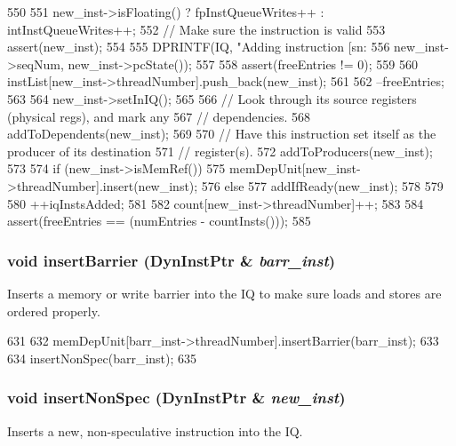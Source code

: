 \begin{DoxyCode}
550 {
551     new_inst->isFloating() ? fpInstQueueWrites++ : intInstQueueWrites++;
552     // Make sure the instruction is valid
553     assert(new_inst);
554 
555     DPRINTF(IQ, "Adding instruction [sn:%
556             new_inst->seqNum, new_inst->pcState());
557 
558     assert(freeEntries != 0);
559 
560     instList[new_inst->threadNumber].push_back(new_inst);
561 
562     --freeEntries;
563 
564     new_inst->setInIQ();
565 
566     // Look through its source registers (physical regs), and mark any
567     // dependencies.
568     addToDependents(new_inst);
569 
570     // Have this instruction set itself as the producer of its destination
571     // register(s).
572     addToProducers(new_inst);
573 
574     if (new_inst->isMemRef()) {
575         memDepUnit[new_inst->threadNumber].insert(new_inst);
576     } else {
577         addIfReady(new_inst);
578     }
579 
580     ++iqInstsAdded;
581 
582     count[new_inst->threadNumber]++;
583 
584     assert(freeEntries == (numEntries - countInsts()));
585 }
\end{DoxyCode}
\hypertarget{classInstructionQueue_ae556f19566bae9c4f55350eab17abacd}{
\subsubsection[{insertBarrier}]{\setlength{\rightskip}{0pt plus 5cm}void insertBarrier ({\bf DynInstPtr} \& {\em barr\_\-inst})}}
\label{classInstructionQueue_ae556f19566bae9c4f55350eab17abacd}
Inserts a memory or write barrier into the IQ to make sure loads and stores are ordered properly. 


\begin{DoxyCode}
631 {
632     memDepUnit[barr_inst->threadNumber].insertBarrier(barr_inst);
633 
634     insertNonSpec(barr_inst);
635 }
\end{DoxyCode}
\hypertarget{classInstructionQueue_a4f7523e76440d88096a4eac14f2e0dd3}{
\subsubsection[{insertNonSpec}]{\setlength{\rightskip}{0pt plus 5cm}void insertNonSpec ({\bf DynInstPtr} \& {\em new\_\-inst})}}
\label{classInstructionQueue_a4f7523e76440d88096a4eac14f2e0dd3}
Inserts a new, non-\/speculative instruction into the IQ. 


